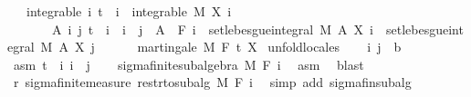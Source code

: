\begin{isabellebody}
\ \ \ integrable{\isacharcolon}{\kern0pt}\ {\isachardoublequoteopen}{\isasymAnd}i{\isachardot}{\kern0pt}\ t\ {\isasymle}\ i\ {\isasymLongrightarrow}\ integrable\ M\ {\isacharparenleft}{\kern0pt}X\ i{\isacharparenright}{\kern0pt}{\isachardoublequoteclose}\isanewline
\ \ \ \ \ \ \ {\isachardoublequoteopen}{\isasymAnd}A\ i\ j{\isachardot}{\kern0pt}\ t\ {\isasymle}\ i\ {\isasymLongrightarrow}\ i\ {\isasymle}\ j\ {\isasymLongrightarrow}\ A\ {\isasymin}\ F\ i\ {\isasymLongrightarrow}\ set{\isacharunderscore}{\kern0pt}lebesgue{\isacharunderscore}{\kern0pt}integral\ M\ A\ {\isacharparenleft}{\kern0pt}X\ i{\isacharparenright}{\kern0pt}\ {\isacharequal}{\kern0pt}\ set{\isacharunderscore}{\kern0pt}lebesgue{\isacharunderscore}{\kern0pt}integral\ M\ A\ {\isacharparenleft}{\kern0pt}X\ j{\isacharparenright}{\kern0pt}{\isachardoublequoteclose}\ \isanewline
\ \ \ \ \ {\isachardoublequoteopen}martingale\ M\ F\ t\ X{\isachardoublequoteclose}\isanewline
%
\isadelimproof
%
\endisadelimproof
%
\isatagproof
{}\isamarkupfalse%
\ {\isacharparenleft}{\kern0pt}unfold{\isacharunderscore}{\kern0pt}locales{\isacharparenright}{\kern0pt}\isanewline
\ \ \isamarkupfalse%
\ i\ j\ {\isacharcolon}{\kern0pt}{\isacharcolon}{\kern0pt}\ {\isacharprime}{\kern0pt}b\ \isamarkupfalse%
\ asm{\isacharcolon}{\kern0pt}\ {\isachardoublequoteopen}t\ {\isasymle}\ i{\isachardoublequoteclose}\ {\isachardoublequoteopen}i\ {\isasymle}\ j{\isachardoublequoteclose}\isanewline
\ \ \isamarkupfalse%
\ sigma{\isacharunderscore}{\kern0pt}finite{\isacharunderscore}{\kern0pt}subalgebra\ M\ {\isachardoublequoteopen}F\ i{\isachardoublequoteclose}\ \isamarkupfalse%
\ asm\ \isamarkupfalse%
\ blast\isanewline
\ \ \isamarkupfalse%
\ r{\isacharcolon}{\kern0pt}\ sigma{\isacharunderscore}{\kern0pt}finite{\isacharunderscore}{\kern0pt}measure\ {\isachardoublequoteopen}restr{\isacharunderscore}{\kern0pt}to{\isacharunderscore}{\kern0pt}subalg\ M\ {\isacharparenleft}{\kern0pt}F\ i{\isacharparenright}{\kern0pt}{\isachardoublequoteclose}\ \isamarkupfalse%
\ {\isacharparenleft}{\kern0pt}simp\ add{\isacharcolon}{\kern0pt}\ sigma{\isacharunderscore}{\kern0pt}fin{\isacharunderscore}{\kern0pt}subalg{\isacharparenright}{\kern0pt}\isanewline
\ \ \isacommand{{\isacharbraceleft}{\kern0pt}}\isamarkupfalse%
\isanewline
\ \ \ \ \isamarkupfalse%

\end{isabellebody}
